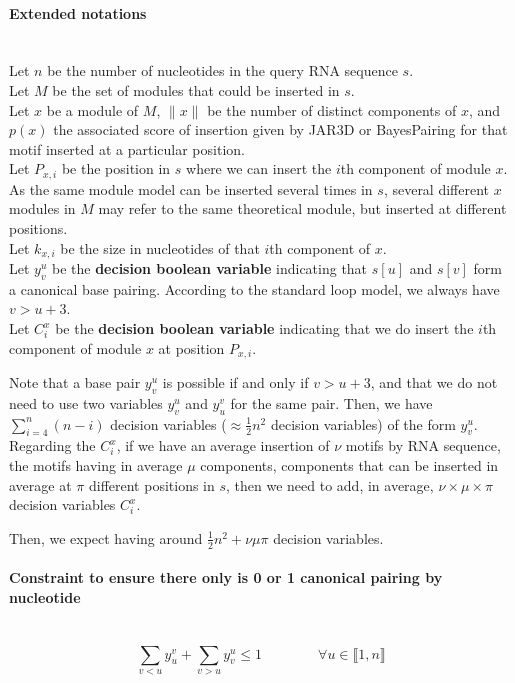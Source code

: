 \documentclass{article}
\begin{document}
\paragraph{Extended notations} ~ \\
Let $n$ be the number of nucleotides in the query RNA sequence $s$.\\
Let $M$ be the set of modules that could be inserted in $s$.\\
Let $x$ be a module of $M$, $\|x\|$ be the number of distinct components of $x$, and $p(x)$ the associated score of insertion given by JAR3D or BayesPairing for that motif inserted at a particular position.\\
Let $P_{x,i}$ be the position in $s$ where we can insert the $i$th component of module $x$.\\
As the same module model can be inserted several times in $s$, several different $x$ modules in $M$ may refer to the same theoretical module, but inserted at different positions.\\
Let $k_{x,i}$ be the size in nucleotides of that $i$th component of $x$.\\
Let $y^u_v$ be the \textbf{decision boolean variable} indicating that $s[u]$ and $s[v]$ form a canonical base pairing. According to the standard loop model, we always have $v > u + 3$.\\
Let $C^x_i$ be the \textbf{decision boolean variable} indicating that we do insert the $i$th component of module $x$ at position $P_{x,i}$.


Note that a base pair $y^u_v$ is possible if and only if $v>u+3$, and that we do not need to use two variables $y^u_v$ and $y^v_u$ for the same pair. 
Then, we have $\sum_{i=4}^n (n-i)$ decision variables ($\approx \frac{1}{2}n^2$ decision variables) of the form $y^u_v$.
Regarding the $C^x_i$, if we have an average insertion of $\nu$ motifs by RNA sequence, the motifs having in average $\mu$ components, components that can be inserted in average at $\pi$ different positions in $s$,
then we need to add, in average, $\nu \times \mu \times \pi$ decision variables $C^x_i$.

Then, we expect having around $\frac{1}{2}n^2+\nu \mu \pi$ decision variables.

\paragraph{Constraint to ensure there only is 0 or 1 canonical pairing by nucleotide} ~ 
\begin{equation} \label{constraint:1}
	\sum_{v<u} y^v_u + \sum_{v>u} y^u_v \leq 1 \qquad\qquad \forall u \in \llbracket 1,n \rrbracket
\end{equation}
\end{document}
